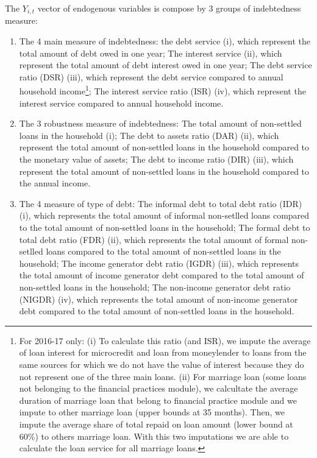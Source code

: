 \documentclass[a4paper, 11pt, onecolumn]{article}
\begin{document}
The $Y_{i,t}$ vector of endogenous variables is compose by 3 groups of indebtedness measure: 
\begin{enumerate}
\item The 4 main measure of indebtedness: the debt service (i), which represent the total amount of debt owed in one year; The interest service (ii), which represent the total amount of debt interest owed in one year; The debt service ratio (DSR) (iii), which represent the debt service compared to annual household income\footnote{For 2016-17 only: (i) To calculate this ratio (and ISR), we impute the average of loan interest for microcredit and loan from moneylender to loans from the same sources for which we do not have the value of interest because they do not represent one of the three main loans. (ii) For marriage loan (some loans not belonging to the financial practices module), we calcultate the average duration of marriage loan that belong to financial practice module and we impute to other marriage loan (upper bounds at 35 months). Then, we impute the average share of total repaid on loan amount (lower bound at 60\%) to others marriage loan. With this two imputations we are able to calculate the loan service for all marriage loans.}; The interest service ratio (ISR) (iv), which represent the interest service compared to annual household income.

\item The 3 robustness measure of indebtedness: The total amount of non-settled loans in the household (i); The debt to assets ratio (DAR) (ii), which represent the total amount of non-settled loans in the household compared to the monetary value of assets; The debt to income ratio (DIR) (iii), which represent the total amount of non-settled loans in the household compared to the annual income.

\item The 4 measure of type of debt: The informal debt to total debt ratio (IDR) (i), which represents the total amount of informal non-setlled loans compared to the total amount of non-settled loans in the household; The formal debt to total debt ratio (FDR) (ii), which represents the total amount of formal non-setlled loans compared to the total amount of non-settled loans in the household; The income generator debt ratio (IGDR) (iii), which represents the total amount of income generator debt compared to the total amount of non-settled loans in the household; The non-income generator debt ratio (NIGDR) (iv), which represents the total amount of non-income generator debt compared to the total amount of non-settled loans in the household.
\end{enumerate}
\end{document}
